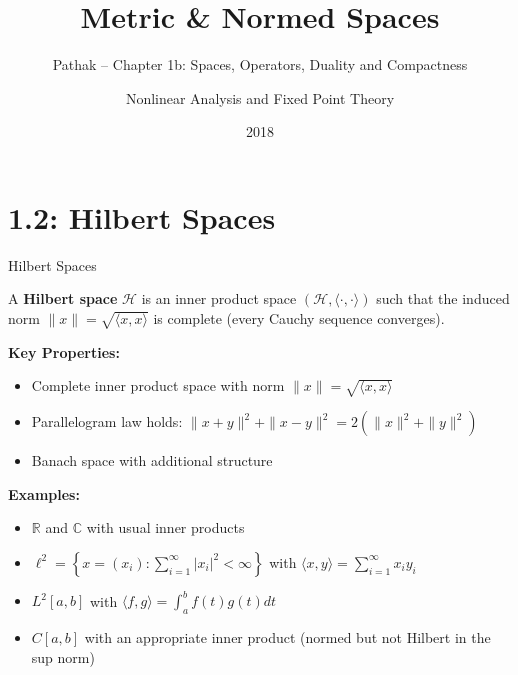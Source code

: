 \documentclass[aspectratio=169,10pt]{beamer}
\title{Metric \& Normed Spaces}
\subtitle{Pathak -- Chapter 1b: Spaces, Operators, Duality and Compactness}
\author{Nonlinear Analysis and Fixed Point Theory}
\date{2018}
\begin{document}
\frame{\titlepage}


\section{1.2: Hilbert Spaces}

\begin{frame}{Hilbert Spaces}
  \begin{definition}
    A \textbf{Hilbert space} $\mathcal{H}$ is an inner product space $(\mathcal{H}, \langle \cdot, \cdot \rangle)$ such that the induced norm $\|x\| = \sqrt{\langle x, x \rangle}$ is complete (every Cauchy sequence converges).
  \end{definition}

  \vspace{0.3cm}
  \textbf{Key Properties:}
  \begin{itemize}
    \item Complete inner product space with norm $\|x\| = \sqrt{\langle x, x \rangle}$
    \item Parallelogram law holds: $\|x+y\|^2 + \|x-y\|^2 = 2(\|x\|^2 + \|y\|^2)$
    \item Banach space with additional structure
  \end{itemize}

  \vspace{0.3cm}
  \textbf{Examples:}
  \begin{itemize}
    \item $\mathbb{R}$ and $\mathbb{C}$ with usual inner products
    \item $\ell^2 = \left\{ x = (x_i) : \sum_{i=1}^{\infty} |x_i|^2 < \infty \right\}$ with $\langle x, y \rangle = \sum_{i=1}^{\infty} x_i y_i$
    \item $L^2[a,b]$ with $\langle f, g \rangle = \int_a^b f(t)g(t) dt$
    \item $C[a,b]$ with an appropriate inner product (normed but not Hilbert in the sup norm)
  \end{itemize}
\end{frame}
\end{document}
